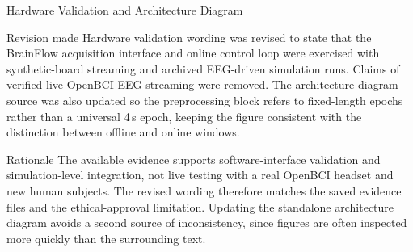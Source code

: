 \documentclass[UTF8,aspectratio=169,11pt]{ctexbeamer}
\begin{document}
\begin{frame}[t]{Hardware Validation and Architecture Diagram}
\footnotesize

    \begin{block}{Revision made}
        Hardware validation wording was revised to state that the BrainFlow acquisition interface and online control loop were exercised with synthetic-board streaming and archived EEG-driven simulation runs. Claims of verified live OpenBCI EEG streaming were removed. The architecture diagram source was also updated so the preprocessing block refers to fixed-length epochs rather than a universal 4\,s epoch, keeping the figure consistent with the distinction between offline and online windows.
    \end{block}

    \vfill

    \begin{alertblock}{Rationale}
        The available evidence supports software-interface validation and simulation-level integration, not live testing with a real OpenBCI headset and new human subjects. The revised wording therefore matches the saved evidence files and the ethical-approval limitation. Updating the standalone architecture diagram avoids a second source of inconsistency, since figures are often inspected more quickly than the surrounding text.
    \end{alertblock}

\end{frame}
\end{document}
